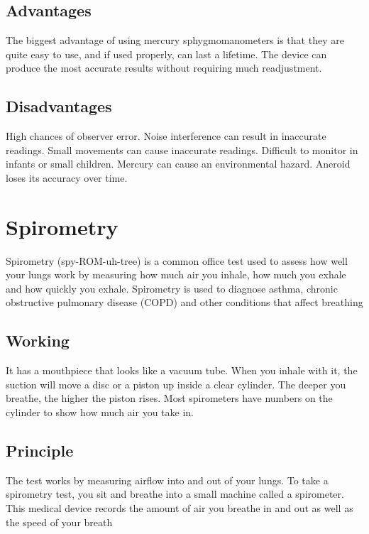 \documentclass[12pt]{article}
\begin{document}
\subsection{Advantages}
The biggest advantage of using mercury sphygmomanometers is that they are quite easy to use, and if used properly, can last a lifetime. The device can produce the most accurate results without requiring much readjustment.



\subsection{Disadvantages}

High chances of observer error.
Noise interference can result in inaccurate readings.
Small movements can cause inaccurate readings.
Difficult to monitor in infants or small children.
Mercury can cause an environmental hazard.
Aneroid loses its accuracy over time.
\clearpage

\section{Spirometry}
Spirometry (spy-ROM-uh-tree) is a common office test used to assess how well your lungs work by measuring how much air you inhale, how much you exhale and how quickly you exhale. Spirometry is used to diagnose asthma, chronic obstructive pulmonary disease (COPD) and other conditions that affect breathing





\subsection{Working}
It has a mouthpiece that looks like a vacuum tube. When you inhale with it, the suction will move a disc or a piston up inside a clear cylinder. The deeper you breathe, the higher the piston rises. Most spirometers have numbers on the cylinder to show how much air you take in.

\subsection{Principle}
The test works by measuring airflow into and out of your lungs. To take a spirometry test, you sit and breathe into a small machine called a spirometer. This medical device records the amount of air you breathe in and out as well as the speed of your breath
\end{document}

